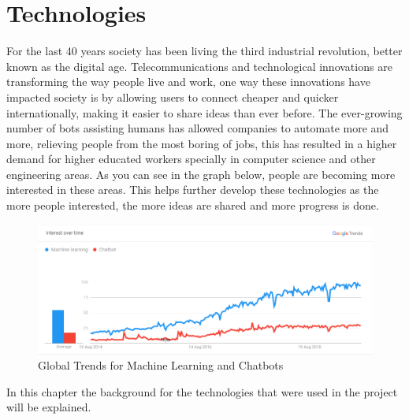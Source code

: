 \chapter{Technologies}\label{sec:chap:2}

For the last 40 years society has been living the third industrial revolution, better known as the digital age. Telecommunications and technological innovations are transforming the way people live and work, one way these innovations have impacted society is by allowing users to connect cheaper and quicker internationally, making it easier to share ideas than ever before. 
The ever-growing number of bots assisting humans has allowed companies to automate more and more, relieving people from the most boring of jobs, this has resulted in a higher demand for higher educated workers specially in computer science and other engineering areas. 
As you can see in the graph below, people are becoming more interested in these areas. This helps further develop these technologies as the more people interested, the more ideas are shared and more progress is done.\\

\begin{center}
	\begin{figure}[h!]
		\centering
		\includegraphics[scale=0.6]{./images/3-mach-chat-trend}
		\caption{Global Trends for Machine Learning and Chatbots}
		\label{global-trends-mach-chat}
	\end{figure}
\end{center}

In this chapter the background for the technologies that were used in the project will be explained. \\

